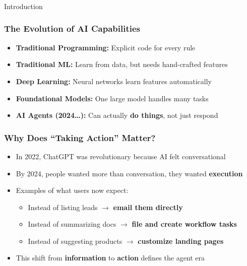 \begin{frame}[fragile]\frametitle{}
\begin{center}
{\Large Introduction}
\end{center}
\end{frame}

\begin{frame}[fragile]\frametitle{The Evolution of AI Capabilities}
\begin{itemize}
    \item \textbf{Traditional Programming:} Explicit code for every rule
    \item \textbf{Traditional ML:} Learn from data, but needs hand-crafted features
    \item \textbf{Deep Learning:} Neural networks learn features automatically
    \item \textbf{Foundational Models:} One large model handles many tasks
    \item \textbf{AI Agents (2024\ldots):} Can actually \textbf{do things}, not just respond
\end{itemize}
\end{frame}

\begin{frame}[fragile]\frametitle{Why Does ``Taking Action'' Matter?}
\begin{itemize}
    \item In 2022, ChatGPT was revolutionary because AI felt conversational
    \item By 2024, people wanted more than conversation, they wanted \textbf{execution}
    \item Examples of what users now expect:
    \begin{itemize}
        \item Instead of listing leads $\rightarrow$ \textbf{email them directly}
        \item Instead of summarizing docs $\rightarrow$ \textbf{file and create workflow tasks}
        \item Instead of suggesting products $\rightarrow$ \textbf{customize landing pages}
    \end{itemize}
    \item This shift from \textbf{information} to \textbf{action} defines the agent era
\end{itemize}
\end{frame}

